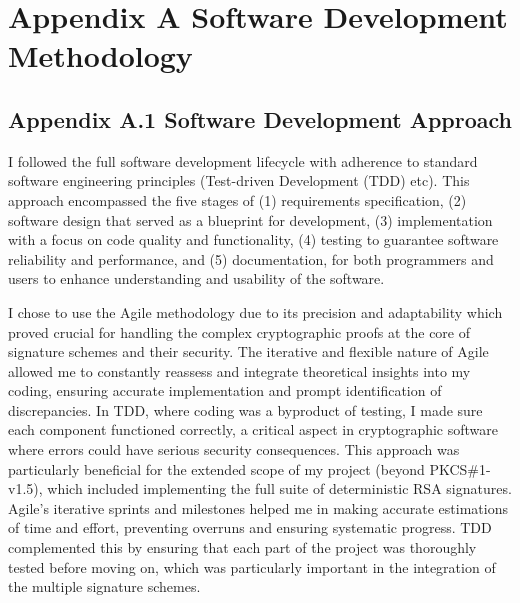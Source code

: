 \documentclass[]{final_report}
\theoremstyle{definition}
\begin{document}
\tableofcontents{}\newpage



{}
\listoffigures




\chapter{Appendix A Software Development Methodology}
\section{Appendix A.1 Software Development Approach}
I followed the full software development lifecycle with adherence to standard software engineering principles (Test-driven Development (TDD) etc). This approach encompassed the five stages of (1) requirements specification, (2) software design that served as a blueprint for development, (3) implementation with a focus on code quality and functionality, (4) testing to guarantee software reliability and performance, and (5) documentation, for both programmers and users to enhance understanding and usability of the software.

I chose to use the Agile methodology due to its precision and adaptability which proved crucial for handling the complex cryptographic proofs at the core of signature schemes and their security. The iterative and flexible nature of Agile allowed me to constantly reassess and integrate theoretical insights into my coding, ensuring accurate implementation and prompt identification of discrepancies. In TDD, where coding was a byproduct of testing, I made sure each component functioned correctly, a critical aspect in cryptographic software where errors could have serious security consequences. This approach was particularly beneficial for the extended scope of my project (beyond PKCS\#1-v1.5), which included implementing the full suite of deterministic RSA signatures. Agile's iterative sprints and milestones helped me in making accurate estimations of time and effort, preventing overruns and ensuring systematic progress. TDD complemented this by ensuring that each part of the project was thoroughly tested before moving on, which was particularly important in the integration of the multiple signature schemes.
\end{document}
